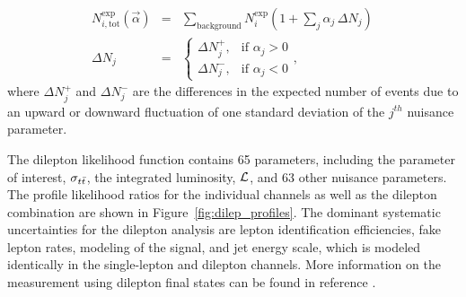 
\begin{eqnarray}\label{Eq:alphaInterpolation}
N^{\text{exp}}_{i, \text{tot}}(\vec{\alpha}) &=& \sum_{\text{background}} N^{\text{exp}}_{i} (1 + \sum_{j} \alpha_{j} \, \Delta N_j  ) \, \\ 
\Delta N_j &=& \begin{cases} \Delta N^{+}_{j}, & \mbox{if } \alpha_{j} > 0  \\ \Delta N^{-}_{j}, & \mbox{if } \alpha_{j} < 0 \end{cases} , 
\end{eqnarray} 
where $\Delta N^{+}_{j}$ and $\Delta N^{-}_{j}$ are the differences in the expected number of events due to an upward or downward fluctuation of one standard deviation of the $j^{th}$ nuisance parameter. 

The dilepton likelihood function contains 65 parameters, including the parameter of interest, $\sigma_{t\bar{t}}$, the integrated luminosity, ${\cal L}$, and 63 other nuisance parameters.
The profile likelihood ratios for the individual channels as well as the dilepton combination are shown in Figure~\ref{fig:dilep_profiles}.  
The dominant systematic uncertainties for the dilepton analysis are lepton identification efficiencies, fake lepton rates, modeling of the signal, and jet energy scale, which is modeled identically in the single-lepton and dilepton channels.
More information on the measurement using dilepton final states can be found in reference \cite{DILEPTON_PAPER}.

